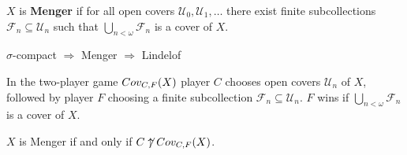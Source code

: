 



  \begin{definition}
    $X$ is \textbf{Menger} if for all open covers $\mathcal{U}_0,\mathcal{U}_1,\dots$ there exist finite subcollections $\mathcal{F}_n \subseteq \mathcal{U}_n$ such that $\bigcup_{n<\omega} \mathcal{F}_n$ is a cover of $X$.
  \end{definition}

  \begin{proposition}
    $\sigma$-compact $\Rightarrow$ Menger $\Rightarrow$ Lindelof
  \end{proposition}

  \begin{definition}
    In the two-player game $Cov_{C,F}(X)$ player $C$ chooses open covers $\mathcal{U}_n$ of $X$, followed by player $F$ choosing a finite subcollection $\mathcal{F}_n\subseteq\mathcal{U}_n$. $F$ wins if $\bigcup_{n<\omega} \mathcal{F}_n$ is a cover of $X$.
  \end{definition}

  \begin{theorem}
    $X$ is Menger if and only if $C \not\uparrow Cov_{C,F}(X)$.
  \end{theorem}

